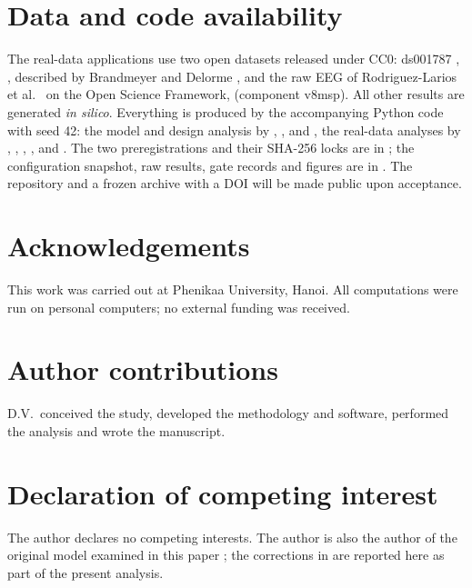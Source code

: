 \documentclass[12pt,a4paper]{article}
\theoremstyle{plain}
\theoremstyle{definition}
\theoremstyle{remark}
\begin{document}
\section*{Data and code availability}
\begingroup\raggedright
The real-data applications use two open datasets released under CC0: ds001787 \citep{Delorme2024ds}, , described by Brandmeyer and Delorme \citep{Brandmeyer2018}, and the raw EEG of Rodriguez-Larios et al.\ \citep{RodriguezLarios2021} on the Open Science Framework,  (component v8msp). All other results are generated \emph{in silico}. Everything is produced by the accompanying Python code with seed 42: the model and design analysis by , ,  and , the real-data analyses by , , , ,  and . The two preregistrations and their SHA-256 locks are in ; the configuration snapshot, raw results, gate records and figures are in . The repository and a frozen archive with a DOI will be made public upon acceptance.
\par\endgroup

\section*{Acknowledgements}
This work was carried out at Phenikaa University, Hanoi. All computations were run on personal computers; no external funding was received. %

\section*{Author contributions}
D.V.\ conceived the study, developed the methodology and software, performed the analysis and wrote the manuscript.

\section*{Declaration of competing interest}
The author declares no competing interests. The author is also the author of the original model examined in this paper \citep{BQI}; the corrections in  are reported here as part of the present analysis.
\end{document}
